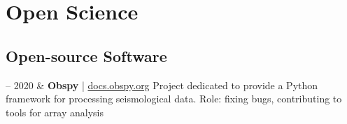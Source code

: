 \documentclass[10pt, a4paper]{article}
\newcommand{\Website}[1]{\href{https://#1}{#1}}
\newcommand{\Duration}[2]{\fontsize{9pt}{0}\selectfont #1 -- #2}
\begin{document}

\section{Open Science}

\subsection{Open-source Software}

\begin{EntriesTable}
  \Duration{2019}{2020} &
  \textbf{Obspy} | \Website{docs.obspy.org}
  \newline
  Project dedicated to provide a Python framework for processing seismological data.
  \newline
  Role: fixing bugs, contributing to tools for array analysis
  \\
\end{EntriesTable}






\end{document}

